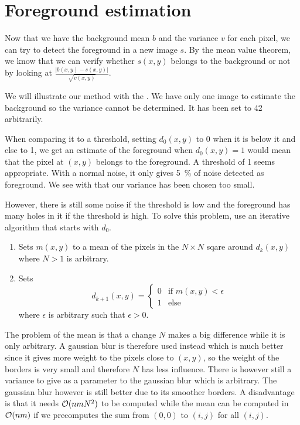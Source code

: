 \section{Foreground estimation}
\label{sec:fg}
Now that we have the background mean $b$ and the variance $v$ for each
pixel, we can try to detect the foreground in a new image $s$.
By the mean value theorem, we know that we can
verify whether $s(x,y)$ belongs to the background or not
by looking at $\frac{|b(x,y) - s(x,y)|}{\sqrt{v(x,y)}}$.

We will illustrate our method with the .
We have only one image to estimate the background so the
variance cannot be determined.
It has been set to 42 arbitrarily.

When comparing it to a threshold, setting $d_0(x,y)$ to 0
when it is below it and else to 1, we
get an estimate of the foreground when $d_0(x,y) = 1$ would mean
that the pixel at $(x,y)$ belongs to the foreground.
A threshold of 1 seems appropriate.
With a normal noise, it only gives \SI{5}{\%} of noise detected as foreground.
We see with  that our variance has been chosen too small.

However, there is still some noise if the threshold is low
and the foreground has many holes in it if the threshold is high.
To solve this problem, use an iterative algorithm that starts with $d_0$.
\begin{enumerate}
  \item Sets $m(x,y)$ to a mean of the pixels in the $N \times N$ sqare around $d_{k}(x,y)$ where $N > 1$ is arbitrary.
  \item Sets
    \[ d_{k+1}(x,y) =
      \begin{cases}
        0 & \text{if }m(x,y) < \epsilon\\
        1 & \text{else}
      \end{cases}
    \]
    where $\epsilon$ is arbitrary such that $\epsilon > 0$.
\end{enumerate}
The problem of the mean is that a change $N$ makes a big difference while it is only arbitrary.
A gaussian blur is therefore used instead which is much better since it gives more weight to the pixels close to $(x,y)$, so the weight of the borders is very small and therefore $N$ has less influence.
There is however still a variance to give as a parameter to the gaussian blur which is arbitrary.
The gaussian blur however is still better due to its smoother borders.
A disadvantage is that it needs $\mathcal{O}(nmN^2)$ to be computed while the mean can be computed in $\mathcal{O}(nm)$ if we precomputes the sum from $(0,0)$ to $(i,j)$ for all $(i,j)$.

